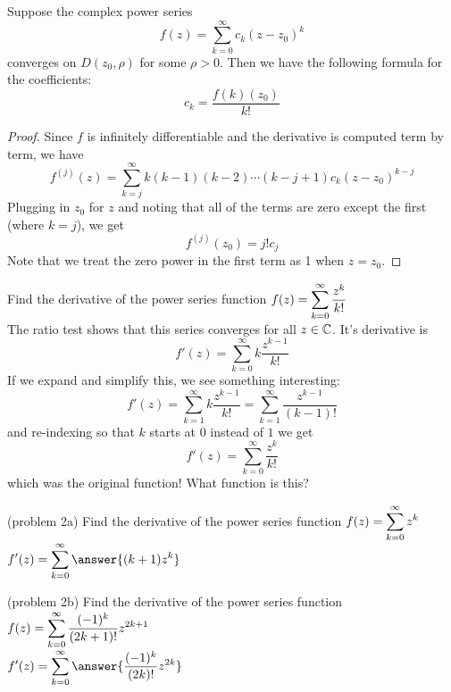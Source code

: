 \documentclass[handout]{ximera}
\begin{document}
\begin{corollary}
Suppose the complex power series
\[
f(z) = \sum_{k=0}^\infty c_k(z-z_0)^k
\]
converges on $D(z_0, \rho)$ for some $\rho > 0$. Then we have the following formula for the coefficients:
\[
c_k = \frac{f(k)(z_0)}{k!}
\]
\end{corollary}
\begin{proof}
Since $f$ is infinitely differentiable and the derivative is computed term by term, we have
\[
f^{(j)}(z) = \sum_{k=j}^\infty k(k-1)(k-2)\cdots(k-j+1)c_k(z-z_0)^{k-j}
\]
Plugging in $z_0$ for $z$ and noting that all of the terms are zero except the first (where $k = j$),
we get
\[
f^{(j)}(z_0) = j!c_j
\]
Note that we treat the zero power in the first term as 1 when $z=z_0$.
\end{proof}

\begin{example}[example 2]
Find the derivative of the power series function $\displaystyle f(z) = \sum_{k=0}^\infty \frac{z^k}{k!}$\\
The ratio test shows that this series converges for all $z \in \mathbb C$. It's derivative is
\[
f'(z) = \sum_{k=0}^\infty k\frac{z^{k-1}}{k!}
\]
If we expand and simplify this, we see something interesting:
\[
f'(z) = \sum_{k=1}^\infty k\frac{z^{k-1}}{k!} = \sum_{k=1}^\infty \frac{z^{k-1}}{(k-1)!}
\]
and re-indexing so that $k$ starts at $0$ instead of $1$ we get
\[
f'(z) = \sum_{k=0}^\infty \frac{z^k}{k!}
\]
which was the original function! What function is this?
\end{example}

\begin{problem}(problem 2a)
Find the derivative of the power series function $\displaystyle f(z) = \sum_{k=0}^\infty z^k$\\
$\dis f'(z) = \sum_{k=0}^\infty \answer{(k+1)z^k}$
\end{problem}

\begin{problem}(problem 2b)
Find the derivative of the power series function $\displaystyle f(z) = \sum_{k=0}^\infty \frac{(-1)^k}{(2k+1)!}z^{2k+1}$\\
$\dis f'(z) = \sum_{k=0}^\infty \answer{\frac{(-1)^k}{(2k)!}z^{2k}}$
\end{problem}
\end{document}
